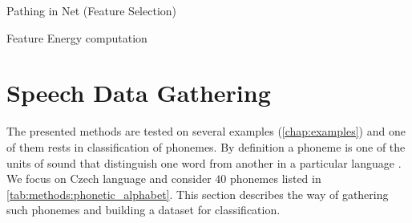 Pathing in Net (Feature Selection)

Feature Energy computation

\newpage
\section{Speech Data Gathering} \label{sec:speech_data_gathering}
The presented methods are tested on several examples (\cref{chap:examples}) and one of them rests in classification of phonemes. By definition a phoneme is one of the units of sound that distinguish one word from another in a particular language \citep{wiki:mnist}. We focus on Czech language and consider $ 40 $ phonemes listed in \cref{tab:methods:phonetic_alphabet}. This section describes the way of gathering such phonemes and building a dataset for classification.

